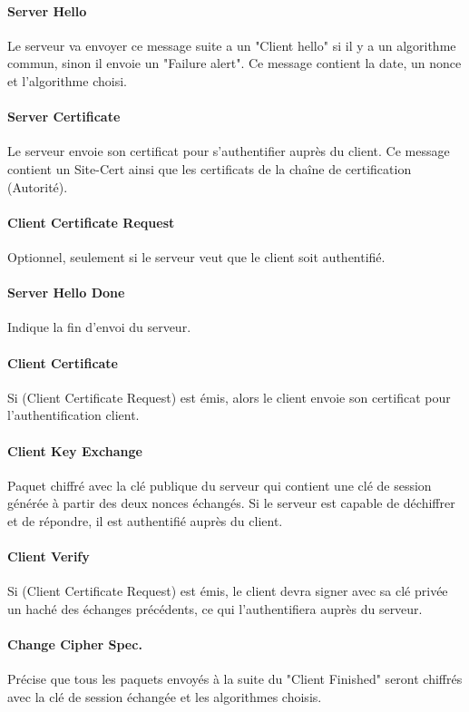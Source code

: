 \paragraph{Server Hello}
Le serveur va envoyer ce message suite a un "Client hello" si il y a un algorithme commun, sinon il envoie un "Failure alert".
Ce message contient la date, un nonce et l'algorithme choisi.
\paragraph{Server Certificate}
Le serveur envoie son certificat pour s'authentifier auprès du client.
Ce message contient un Site-Cert ainsi que les certificats de la chaîne de certification (Autorité).
\paragraph{Client Certificate Request}
Optionnel, seulement si le serveur veut que le client soit authentifié.
\paragraph{Server Hello Done}
Indique la fin d'envoi du serveur.
\paragraph{Client Certificate}
Si (Client Certificate Request) est émis, alors le client envoie son certificat pour l'authentification client. 
\paragraph{Client Key Exchange}
Paquet chiffré avec la clé publique du serveur qui contient une clé de session générée à partir des deux nonces échangés. Si le serveur est capable de déchiffrer et de répondre, il est authentifié auprès du client.
\paragraph{Client Verify}
Si (Client Certificate Request) est émis, le client devra signer avec sa clé privée un haché des échanges précédents, ce qui l'authentifiera auprès du serveur. 
\paragraph{Change Cipher Spec.}
Précise que tous les paquets envoyés à la suite du "Client Finished" seront chiffrés avec la clé de session échangée et les algorithmes choisis. 
